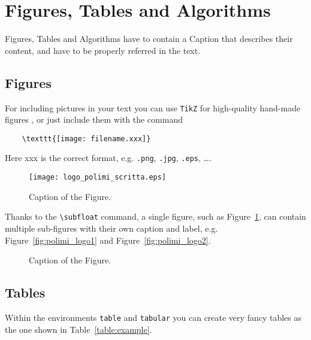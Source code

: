 \section{Figures, Tables and Algorithms}

Figures, Tables and Algorithms have to contain a Caption that describes their content, and have to be properly referred in the text.

\subsection{Figures}
\label{subsec:figures}

For including pictures in your text you can use \texttt{TikZ} for high-quality hand-made figures \cite{tikz},
or just include them with the command
\begin{verbatim}
	\texttt{[image: filename.xxx]}
\end{verbatim}
Here xxx is the correct format, e.g.  \verb|.png|, \verb|.jpg|, \verb|.eps|, \dots.

\begin{figure}[H]
	\centering
	\texttt{[image: logo\_polimi\_scritta.eps]}
	\caption{Caption of the Figure.}
	\label{fig:quadtree}
\end{figure}

Thanks to the \texttt{\textbackslash subfloat} command, a single figure, such as Figure~\ref{fig:quadtree},
can contain multiple sub-figures with their own caption and label, e.g. Figure~\ref{fig:polimi_logo1} and Figure~\ref{fig:polimi_logo2}. 

\begin{figure}[H]
	\centering
	\quad
	\caption[]{Caption of the Figure.}
	\label{fig:quadtree2}
\end{figure}

\subsection{Tables}
\label{subsec:tables}

Within the environments \texttt{table} and  \texttt{tabular} you can create very fancy tables as the one shown in Table~\ref{table:example}.

